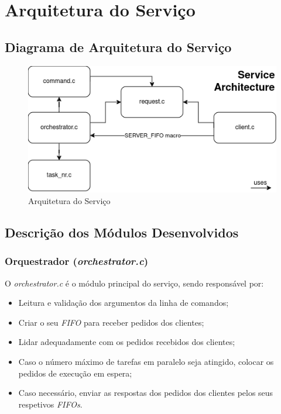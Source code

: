 \documentclass[a4paper,11pt]{scrreprt}
\begin{document}


\chapter{Arquitetura do Serviço}
    \section{Diagrama de Arquitetura do Serviço}
        \begin{figure}[!ht]
            \centering
            \includegraphics[scale=0.7]{diagrams/architecture.png}
            \caption{Arquitetura do Serviço}
            \label{fig:1.1}
        \end{figure}
    \section{Descrição dos Módulos Desenvolvidos}
        \subsection{Orquestrador (\textit{orchestrator.c})}
            O \textit{orchestrator.c} é o módulo principal do serviço, sendo responsável por:
            \begin{itemize}
                \item Leitura e validação dos argumentos da linha de comandos;
                \item Criar o seu \textit{FIFO} para receber pedidos dos clientes;
                \item Lidar adequadamente com os pedidos recebidos dos clientes;
                \item Caso o número máximo de tarefas em paralelo seja atingido,
                    colocar os pedidos de execução em espera;
                \item Caso necessário, enviar as respostas dos pedidos dos clientes pelos seus respetivos \textit{FIFOs}.
            \end{itemize}
\end{document}
